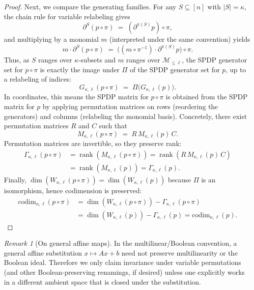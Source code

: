 \documentclass[12pt]{article}
\theoremstyle{definition}
\theoremstyle{remark}
\newtheorem{remark}[theorem]{Remark}
\begin{document}
\begin{proof}
Next, we compare the generating families. For any $S\subseteq[n]$ with $|S|=\kappa$,
the chain rule for variable relabeling gives
\[
\partial^{S}(p\circ \pi) \;=\; (\partial^{\pi(S)} p)\circ \pi,
\]
and multiplying by a monomial $m$ (interpreted under the same convention) yields
\[
m \cdot \partial^{S}(p\circ \pi)
\;=\;
\bigl((m\circ \pi^{-1})\cdot \partial^{\pi(S)}p\bigr)\circ \pi.
\]
Thus, as $S$ ranges over $\kappa$-subsets and $m$ ranges over $\mathcal{M}_{\le \ell}$,
the SPDP generator set for $p\circ \pi$ is exactly the image under $\Pi$ of the
SPDP generator set for $p$, up to a relabeling of indices:
\[
G_{\kappa,\ell}(p\circ \pi) \;=\; \Pi\bigl(G_{\kappa,\ell}(p)\bigr).
\]
In coordinates, this means the SPDP matrix for $p\circ \pi$ is obtained from the
SPDP matrix for $p$ by applying permutation matrices on rows (reordering the
generators) and columns (relabeling the monomial basis). Concretely, there exist
permutation matrices $R$ and $C$ such that
\[
M_{\kappa,\ell}(p\circ \pi) \;=\; R\, M_{\kappa,\ell}(p)\, C.
\]
Permutation matrices are invertible, so they preserve rank:
\begin{align*}
\Gamma_{\kappa,\ell}(p\circ \pi)
&= \operatorname{rank}(M_{\kappa,\ell}(p\circ \pi))
= \operatorname{rank}(R\,M_{\kappa,\ell}(p)\,C) \\
&= \operatorname{rank}(M_{\kappa,\ell}(p))
= \Gamma_{\kappa,\ell}(p).
\end{align*}
Finally, $\dim(W_{\kappa,\ell}(p\circ \pi))=\dim(W_{\kappa,\ell}(p))$ because $\Pi$ is an
isomorphism, hence codimension is preserved:
\begin{align*}
\mathrm{codim}_{\kappa,\ell}(p\circ \pi)
&= \dim(W_{\kappa,\ell}(p\circ \pi))-\Gamma_{\kappa,\ell}(p\circ \pi) \\
&= \dim(W_{\kappa,\ell}(p))-\Gamma_{\kappa,\ell}(p)
= \mathrm{codim}_{\kappa,\ell}(p).
\end{align*}
\end{proof}

\begin{remark}[On general affine maps]
In the multilinear/Boolean convention, a general affine substitution $x\mapsto Ax+b$
need not preserve multilinearity or the Boolean ideal. Therefore we only claim invariance
under variable permutations (and other Boolean-preserving renamings, if desired) unless
one explicitly works in a different ambient space that is closed under the substitution.
\end{remark}

\end{document}
